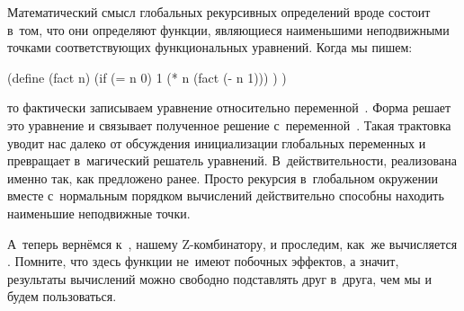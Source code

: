 Математический смысл глобальных рекурсивных определений вроде  состоит
в~том, что они определяют функции, являющиеся наименьшими неподвижными точками
соответствующих функциональных уравнений. Когда мы пишем:

\begin{code:lisp}
(define (fact n)
  (if (= n 0) 1
      (* n (fact (- n 1))) ) )
\end{code:lisp}

\noindent
то фактически записываем уравнение относительно переменной~. Форма
 решает это уравнение и связывает полученное решение
с~переменной~. Такая трактовка уводит нас далеко от обсуждения
инициализации глобальных переменных
и превращает  в~магический решатель уравнений. В~действительности,
 реализована именно так, как предложено ранее. Просто рекурсия
в~глобальном окружении вместе с~нормальным порядком вычислений действительно
способны находить наименьшие неподвижные точки.

А~теперь вернёмся к~, нашему Z-комбинатору, и проследим, как~же
вычисляется . Помните, что здесь функции не~имеют
побочных эффектов, а значит, результаты вычислений можно свободно подставлять
друг в~друга, чем мы и будем пользоваться.

